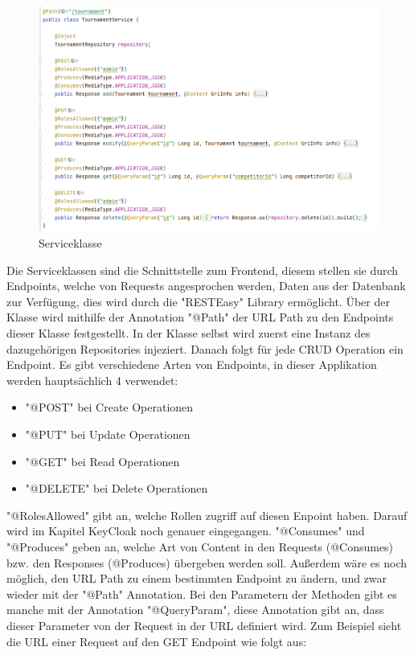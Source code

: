 \begin{figure}[H]
    \includegraphics[scale=0.6]{pics/service_class.png}
    \caption{Serviceklasse}
\end{figure}

Die Serviceklassen sind die Schnittstelle zum Frontend, diesem stellen sie durch Endpoints, welche von Requests angesprochen werden, Daten aus der Datenbank zur Verfügung, dies wird durch die "RESTEasy" Library ermöglicht.
Über der Klasse wird mithilfe der Annotation "@Path" der URL Path zu den Endpoints dieser Klasse festgestellt. In der Klasse selbst wird zuerst eine Instanz des dazugehörigen Repositories injeziert. 
Danach folgt für jede CRUD Operation ein Endpoint. Es gibt verschiedene Arten von Endpoints, in dieser Applikation werden hauptsächlich 4 verwendet:

\begin{itemize}
    \item "@POST" bei Create Operationen
    \item "@PUT" bei Update Operationen
    \item "@GET" bei Read Operationen
    \item "@DELETE" bei Delete Operationen
\end{itemize}

"@RolesAllowed" gibt an, welche Rollen zugriff auf diesen Enpoint haben. Darauf wird im Kapitel KeyCloak noch genauer eingegangen. "@Consumes" und "@Produces" geben an, 
welche Art von Content in den Requests (@Consumes) bzw. den Responses (@Produces) übergeben werden soll. Außerdem wäre es noch möglich, den URL Path zu einem bestimmten Endpoint zu ändern, 
und zwar wieder mit der "@Path" Annotation. Bei den Parametern der Methoden gibt es manche mit der Annotation "@QueryParam", diese Annotation gibt an, dass dieser Parameter von der 
Request in der URL definiert wird. Zum Beispiel sieht die URL einer Request auf den GET Endpoint wie folgt aus:

